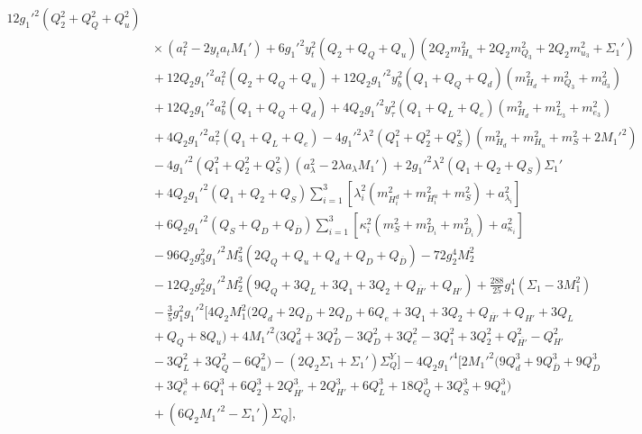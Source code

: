 \documentclass[preprint,amsmath,amssymb,aps,superscriptaddress,prd,
showpacs,floatfix,nofootinbib]{revtex4-1}
\begin{document}
\begin{subequations}
\begin{align}
12 g_1'^2 \left ( Q_2^2 + Q_Q^2 + Q_u^2 \right ) \nonumber \\
& {} \times \left ( a_t^2 - 2 y_t a_t M_1' \right ) +
6 g_1'^2 y_t^2 \left ( Q_2 + Q_Q + Q_u \right )
\left ( 2 Q_2 m_{H_u}^2 + 2 Q_2 m_{Q_3}^2 + 2 Q_2 m_{u_3}^2 + \Sigma_1'
\right ) \nonumber \\
& {} + 12 Q_2 g_1'^2 a_t^2 \left ( Q_2 + Q_Q + Q_u \right ) +
12 Q_2 g_1'^2 y_b^2 \left ( Q_1 + Q_Q + Q_d \right ) \left ( m_{H_d}^2 +
m_{Q_3}^2 + m_{d_3}^2 \right ) \nonumber \\
& {} + 12 Q_2 g_1'^2 a_b^2 \left ( Q_1 + Q_Q + Q_d \right ) +
4 Q_2 g_1'^2 y_\tau^2 \left ( Q_1 + Q_L + Q_e \right ) \left ( m_{H_d}^2 +
m_{L_3}^2 + m_{e_3}^2 \right ) \nonumber \\
& {} + 4 Q_2 g_1'^2 a_\tau^2 \left ( Q_1 + Q_L + Q_e \right ) -
4 g_1'^2 \lambda^2 \left ( Q_1^2 + Q_2^2 + Q_S^2 \right ) \left ( m_{H_d}^2 +
m_{H_u}^2 + m_S^2 + 2 M_1'^2 \right ) \nonumber \\
& {} - 4 g_1'^2 \left ( Q_1^2 + Q_2^2 + Q_S^2 \right ) \left ( a_\lambda^2 -
2 \lambda a_\lambda M_1' \right ) + 2 g_1'^2 \lambda^2 \left ( Q_1 + Q_2 +
Q_S \right ) \Sigma_1' \nonumber \\
& {} + 4 Q_2 g_1'^2 \left ( Q_1 + Q_2 + Q_S \right ) \sum_{i=1}^3 \left [
\lambda_i^2 \left ( m_{H_i^d}^2 + m_{H_i^u}^2 + m_S^2 \right ) +
a_{\lambda_i}^2 \right ] \nonumber \\
& {} + 6 Q_2 g_1'^2 \left ( Q_S + Q_D + Q_{\overline{D}} \right ) \sum_{i=1}^3
\left [ \kappa_i^2 \left ( m_S^2 + m_{D_i}^2 + m_{\overline{D}_i}^2 \right )
+ a_{\kappa_i}^2 \right ] \nonumber \\
& {} - 96 Q_2 g_3^2 g_1'^2 M_3^2 \left ( 2 Q_Q + Q_u + Q_d + Q_D +
Q_{\overline{D}} \right ) - 72 g_2^4 M_2^2 \nonumber \\
& {} - 12 Q_2 g_2^2 g_1'^2 M_2^2 \left ( 9 Q_Q + 3 Q_L + 3 Q_1 + 3 Q_2 +
Q_{\overline{H'}} + Q_{H'} \right ) + \frac{288}{25} g_1^4 \left ( \Sigma_1 -
3 M_1^2 \right ) \nonumber \\
& {} - \frac{3}{5} g_1^2 g_1'^2 \Big [ 4 Q_2 M_1^2 \big ( 2 Q_d +
2 Q_{\overline{D}} + 2 Q_D + 6 Q_e + 3 Q_1 + 3 Q_2 + Q_{\overline{H'}} +
Q_{H'} + 3 Q_L \nonumber \\
& {} + Q_Q + 8 Q_u \big ) + 4 M_1'^2 \big ( 3 Q_d^2 + 3 Q_{\overline{D}}^2 -
3 Q_D^2 + 3 Q_e^2 - 3 Q_1^2 + 3 Q_2^2 + Q_{\overline{H'}}^2 - Q_{H'}^2
\nonumber \\
& {} - 3 Q_L^2 + 3 Q_Q^2 - 6 Q_u^2 \big ) - \left ( 2 Q_2 \Sigma_1 + \Sigma_1'
\right ) \Sigma_Q^Y \Big ] - 4 Q_2 g_1'^4 \Big [ 2 M_1'^2 \big ( 9 Q_d^3 +
9 Q_{\overline{D}}^3 + 9 Q_D^3 \nonumber \\
& {} + 3 Q_e^3 + 6 Q_1^3 + 6 Q_2^3 + 2 Q_{\overline{H'}}^3 + 2 Q_{H'}^3 +
6 Q_L^3 + 18 Q_Q^3 + 3 Q_S^3 + 9 Q_u^3 \big ) \nonumber \\
& {} + \left ( 6 Q_2 M_1'^2 - \Sigma_1' \right ) \Sigma_Q \Big ] ,
\label{eq:USSMmHu2Ot2Coeff}
\end{align}
\end{subequations}
\end{document}
